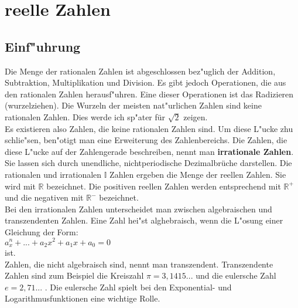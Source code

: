 \section{reelle Zahlen}
\subsection{Einf"uhrung}
Die Menge der rationalen Zahlen ist abgeschlossen bez"uglich der
Addition, Subtraktion, Multiplikation und Division. Es gibt jedoch
Operationen, die aus den rationalen Zahlen herausf"uhren.
Eine dieser Operationen ist das Radizieren (wurzelziehen). Die Wurzeln der
meisten nat"urlichen Zahlen sind keine rationalen Zahlen. Dies werde ich sp"ater
für $\sqrt{2}$ zeigen.\\
Es existieren also Zahlen, die keine rationalen Zahlen sind. Um diese L"ucke zhu
schlie"sen, ben"otigt man eine Erweiterung des Zahlenbereichs. Die Zahlen, die
diese L"ucke auf der Zahlengerade beschreiben, nennt man \textbf{irrationale Zahlen}.
Sie lassen sich durch unendliche, nichtperiodische Dezimalbrüche darstellen.
Die rationalen und irrationalen $\mathbb{I}$ Zahlen ergeben die Menge der reellen Zahlen.
Sie wird mit $\mathbb{R}$ bezeichnet.
Die positiven reellen Zahlen werden entsprechend mit $\mathbb{R^+}$ und die
negativen mit $\mathbb{R^-}$ bezeichnet.\\
Bei den irrationalen Zahlen unterscheidet man zwischen algebraischen und transzendenten
Zahlen. Eine Zahl hei"st alghebraisch, wenn die L"osung einer Gleichung der Form:\\
$a_x^n + ... + a_2x^2 + a_1x + a_0 = 0$
\\
ist.\\
Zahlen, die nicht algebraisch sind, nennt man transzendent.
Transzendente Zahlen sind zum Beispiel die Kreiszahl $\pi = 3,1415...$ und die eulersche
Zahl $e = 2,71 ...$ .
Die eulersche Zahl spielt bei den Exponential- und Logarithmusfunktionen eine wichtige Rolle.

